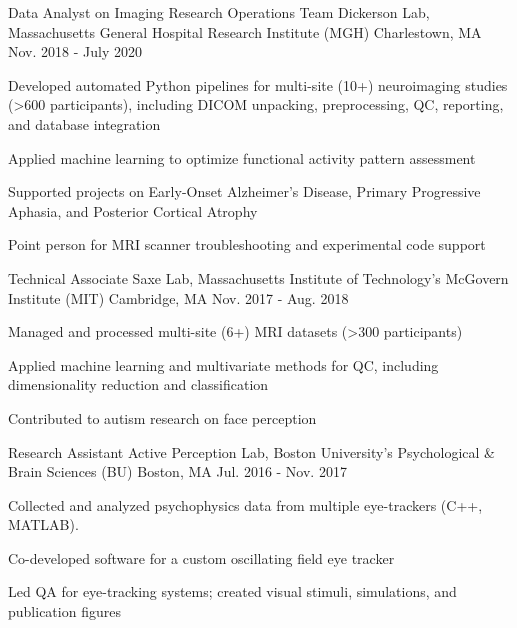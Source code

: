\begin{cventries}
  \cventry
    {Data Analyst on Imaging Research Operations Team}
    {Dickerson Lab, Massachusetts General Hospital Research Institute (MGH)}
    {Charlestown, MA}
    {Nov. 2018 - July 2020}
    {
      \begin{cvitems}
        \item {Developed automated Python pipelines for multi-site (10+) neuroimaging studies (>600 participants), including DICOM unpacking, preprocessing, QC, reporting, and database integration}
        \item{Applied machine learning to optimize functional activity pattern assessment}
       \item{Supported projects on Early-Onset Alzheimer’s Disease, Primary Progressive Aphasia, and Posterior Cortical Atrophy}
        \item {Point person for MRI scanner troubleshooting and experimental code support}
      \end{cvitems}
    }
  \cventry
    {Technical Associate}
    {Saxe Lab, Massachusetts Institute of Technology's McGovern Institute (MIT)}
    {Cambridge, MA}
    {Nov. 2017 - Aug. 2018}
    {
      \begin{cvitems}
        \item {Managed and processed multi-site (6+) MRI datasets (>300 participants)}
        \item {Applied machine learning and multivariate methods for QC, including dimensionality reduction and classification}
        \item{Contributed to autism research on face perception} 
      \end{cvitems}
    }
  \cventry
    {Research Assistant}
    {Active Perception Lab, Boston University's Psychological \& Brain Sciences (BU)}
    {Boston, MA}
    {Jul. 2016 - Nov. 2017}
    {
      \begin{cvitems}
	\item {Collected and analyzed psychophysics data from multiple eye-trackers (C++, MATLAB).}
        \item {Co-developed software for a custom oscillating field eye tracker}      
        \item {Led QA for eye-tracking systems; created visual stimuli, simulations, and publication figures}
      \end{cvitems}
    }
\end{cventries}
